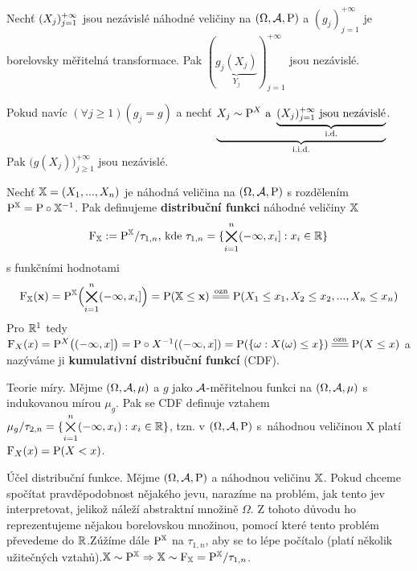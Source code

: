 \begin{dusl}
	Nechť $(X_j)_{j=1}^{+\infty}$ jsou nezávislé náhodné veličiny na $(\Omega,\mathcal{A},\mathrm{P})$ a $(g_j)_{j=1}^{+\infty}$ je borelovsky měřitelná transformace. Pak $(\underbrace{g_j(X_j)}_{Y_j})_{j=1}^{+\infty}$ jsou nezávislé.
\end{dusl}
\begin{dusl}
	Pokud navíc $(\forall j\geq 1)(g_j=g)$ a nechť $\underbrace{X_j \sim \mathrm{P}^X \text{ a } \underbrace{(X_j)_{j=1}^{+\infty} \text{ jsou nezávislé}}_{\text{i.d.}}}_{\text{i.i.d.}}$. Pak $\bigl(g(X_j)\bigr)_{j\geq 1}^{+\infty}$ jsou nezávislé.
\end{dusl}
\begin{define}
	Nechť $\mathbb{X}=(X_1,...,X_n)$ je náhodná veličina na $(\Omega,\mathcal{A},\mathrm{P})$ s rozdělením \newline $\mathrm{P}^{\mathbb{X}}=\mathrm{P}\circ \mathbb{X}^{-1}$. Pak definujeme \textbf{distribuční funkci} náhodné veličiny $\mathbb{X}$ $$\mathrm{F}_{\mathbb{X}}:=\mathrm{P}^{\mathbb{X}} / \tau_{1,n} \text{, kde } \tau_{1,n} = \{ \bigtimes\limits_{i=1}^n (-\infty,x_i]:x_i \in\mathbb{R} \}$$ s funkčními hodnotami 
	$$\FEX(\textbf{x})=\PP^\X\Bigl(\bigtimes\limits_{i=1}^n (-\infty,x_i]\Bigr)=\PP(\X\leq\textbf{x})\equal{\text{ozn}}{\PP(X_1\leq x_1,X_2\leq x_2,...,X_n\leq x_n)}$$	
	Pro $\mathbb{R}^1$ tedy $ \FF_X(x)=\PP^X\bigl((-\infty,x]\bigr)=\PP\circ X^{-1}((-\infty,x])=\PP(\{ \omega:X(\omega)\leq x \}) \equal{\text{ozn}}\PP(X\leq x) $ a nazýváme ji \textbf{kumulativní distribuční funkcí} (CDF).
\end{define}
\begin{remark}
	Teorie míry. Mějme $(\Omega,\mathcal{A},\mu)$ a $g$ jako $\mathcal{A}$-měřitelnou funkci na $(\Omega,\mathcal{A},\mu)$ s indukovanou mírou $\mu_g$. Pak se CDF definuje vztahem $\mu_g / \tau_{2,n}=\{ \bigtimes\limits_{i=1}^n (-\infty,x_i):x_i \in\mathbb{R} \}$, tzn. v $(\Omega,\mathcal{A},\mathrm{P})$ s~náhodnou veličinou X platí $\mathrm{F}_X(x)=\mathrm{P}(X<x)$.
\end{remark}
\begin{remark}
	Účel distribuční funkce. Mějme $(\Omega,\mathcal{A},\mathrm{P})$ a náhodnou veličinu $\mathbb{X}$. Pokud chceme spočítat pravděpodobnost nějakého jevu, narazíme na problém, jak tento jev interpretovat, jelikož náleží abstraktní množině $\Omega$. Z tohoto důvodu ho reprezentujeme nějakou borelovskou množinou, pomocí které tento problém převedeme do $\mathbb{R}$.\newline Zúžíme dále $\mathrm{P}^{\mathbb{X}}$ na $\tau_{1,n}$, aby se to lépe počítalo (platí několik užitečných vztahů).\newline $\mathbb{X}\sim \mathrm{P}^{\mathbb{X}}\Rightarrow \mathbb{X}\sim \mathrm{F}_{\mathbb{X}}=\mathrm{P}^{\mathbb{X}} / \tau_{1,n}$.
\end{remark}
